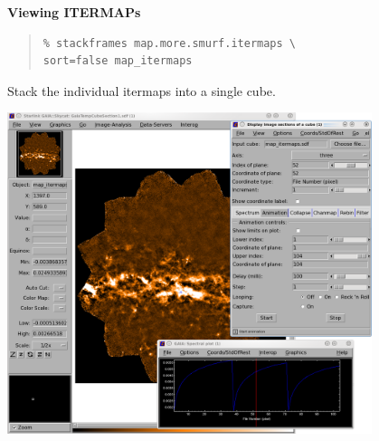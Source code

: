 \documentclass[twoside,11pt]{article}
\newenvironment{latexonly}{}{}
\renewcommand{\_}{\texttt{\symbol{95}}}
\newenvironment{fmpage}[1]{\begin{lrbox}{\fmbox}\begin{minipage}{#1}}{\end{minipage}\end{lrbox}\fbox{\usebox{\fmbox}}}
\newenvironment{myquote}{
   \color{MidnightBlue}\begin{quote}\begin{small}}{
   \end{small}\end{quote}
}
\renewenvironment{myquote}{
      \begin{quote}\begin{small}}{
      \end{small}\end{quote}
   }
\begin{document}
\begin{latexonly}
\begin{figure}[ht!]
\begin{center}
\begin{fmpage}{0.95\linewidth}
\vspace{0.2cm}
\hspace{2mm}
\textbf{Viewing ITERMAPs}

\vspace{0.5cm}

\begin{minipage}[c]{0.65\linewidth}

\begin{myquote}
\begin{verbatim}
% stackframes map.more.smurf.itermaps \
sort=false map_itermaps
\end{verbatim}
\end{myquote}
\end{minipage}
\hspace{0.3cm}
\begin{minipage}[c]{0.29\linewidth}
Stack the individual itermaps into a single cube.
\end{minipage}

\vspace{0.5cm}

\begin{minipage}[c]{0.65\linewidth}
\centering
\includegraphics[width=0.95\textwidth]{sc21_itermaps_anim}


\end{minipage}
\end{fmpage}
\end{center}
\end{figure}
\end{latexonly}
\end{document}
